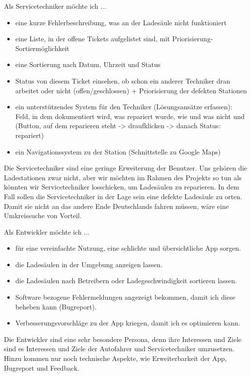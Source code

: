 \documentclass[utf8]{lni}
\begin{document}
Als Servicetechniker möchte ich ...
\begin{itemize}
	\item eine kurze Fehlerbeschreibung, was an der Ladesäule nicht funktioniert
	\item eine Liste, in der offene Tickets aufgelistet sind, mit Priorisierung-Sortiermöglichkeit
	\item eine Sortierung nach Datum, Uhrzeit und Status
	\item Status von diesem Ticket einsehen, ob schon ein anderer Techniker dran arbeitet oder nicht (offen/geschlossen) + Priorisierung der defekten Stationen
	\item ein unterstützendes System für den Techniker (Lösungsansätze erfassen):  Feld, in dem dokumentiert wird, was repariert wurde, wie und was nicht und (Button, auf dem reparieren steht -> draufklicken -> danach Status: repariert)
	\item ein Navigationssystem zu der Station (Schnittstelle zu Google Maps)
\end{itemize}

Die Servicetechniker sind eine geringe Erweiterung der Benutzer. Uns gehören die Ladestationen zwar nicht, aber wir möchten im Rahmen des Projekts so tun als könnten wir Servicetechniker losschicken, um Ladesäulen zu reparieren. In dem Fall sollen die Servicetechniker in der Lage sein eine defekte Ladesäule zu orten. Damit sie nicht an das andere Ende Deutschlands fahren müssen, wäre eine Umkreissuche von Vorteil.

Als Entwickler möchte ich ...

\begin{itemize}
	\item für eine vereinfachte Nutzung, eine schlichte und übersichtliche App sorgen.
	\item die Ladesäulen in der Umgebung anzeigen lassen.
	\item die Ladesäulen nach Betreibern oder Ladegeschwindigkeit sortieren lassen.
	\item Software bezogene Fehlermeldungen angezeigt bekommen, damit ich diese beheben kann (Bugreport).
	\item Verbesserungsvorschläge zu der App kriegen, damit ich es optimieren kann.
\end{itemize}

Die Entwickler sind eine sehr besondere Persona, denn ihre Interessen und Ziele sind es Interessen und Ziele der Autofahrer und Servicetechniker umzusetzen. Hinzu kommen nur noch technische Aspekte, wie Erweiterbarkeit der App, Bugreport und Feedback.
\end{document}
